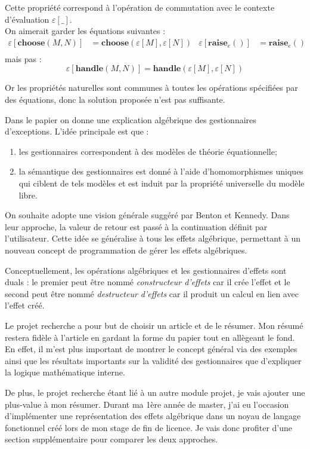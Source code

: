 	\begin{exemple}\label{exEval}
		Cette propriété correspond à l'opération de commutation avec le contexte d'évaluation $\varepsilon[\_]$.\\
		On aimerait garder les équations suivantes : 
		\begin{align*}
			\varepsilon[\textbf{choose}(M,N)] &= \textbf{choose}(\varepsilon[M],\varepsilon[N]) & \varepsilon[\textbf{raise}_e()] &= \textbf{raise}_e()\\
		\end{align*}
		mais pas : 
		\[\varepsilon[\textbf{handle}(M,N)] = \textbf{handle}(\varepsilon[M],\varepsilon[N])\]
	
		Or les propriétés naturelles sont communes à toutes les opérations spécifiées par des équations, donc la solution proposée n'est pas suffisante.
	\end{exemple} 

	Dans le papier on donne une explication algébrique des gestionnaires d'exceptions. L'idée principale est que :
	\begin{enumerate}
		\item les gestionnaires correspondent à des modèles de théorie équationnelle;
		\item la sémantique des gestionnaires est donné à l'aide d'homomorphismes uniques qui ciblent de tels modèles et est induit par la propriété universelle du modèle libre. 
	\end{enumerate}

	On souhaite adopte une vision générale suggéré par Benton et Kennedy. Dans leur approche, la valeur de retour est passé à la continuation définit par l'utilisateur. Cette idée se généralise à tous les effets algébrique, permettant à un nouveau concept de programmation de gérer les effets algébriques. 
	
	Conceptuellement, les opérations algébriques et les gestionnaires d'effets sont duals : le premier peut être nommé \textit{constructeur d'effets} car il crée l'effet et le second peut être nommé \textit{destructeur d'effets} car il produit un calcul en lien avec l'effet créé.
	\smallbreak
	
	Le projet recherche a pour but de choisir un article et de le résumer. Mon résumé restera fidèle à l'article en gardant
	la forme du papier tout en allègeant le fond. En effet, il m'est plus important de montrer le concept général via des exemples ainsi
	que les résultats importants sur la validité des gestionnaires que d'expliquer la logique mathématique interne.

	De plus, le projet recherche étant lié à un autre module projet, je vais ajouter une plus-value à mon résumer. Durant ma 
	1ère année de master, j'ai eu l'occasion d'implémenter une représentation des effets algébrique dans un noyau de langage fonctionnel créé lors de mon stage de fin de licence. Je vais donc profiter d'une section supplémentaire pour comparer les deux approches.
	
	